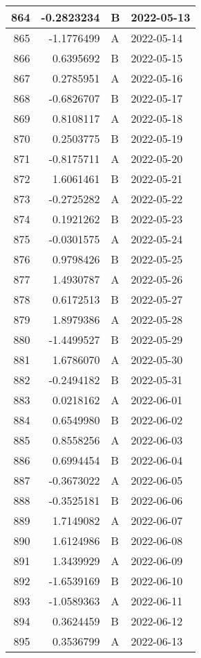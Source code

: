 \begin{tabular}{r|r|l|l}
\hline
864 & -0.2823234 & B & 2022-05-13\\
\hline
865 & -1.1776499 & A & 2022-05-14\\
\hline
866 & 0.6395692 & B & 2022-05-15\\
\hline
867 & 0.2785951 & A & 2022-05-16\\
\hline
868 & -0.6826707 & B & 2022-05-17\\
\hline
869 & 0.8108117 & A & 2022-05-18\\
\hline
870 & 0.2503775 & B & 2022-05-19\\
\hline
871 & -0.8175711 & A & 2022-05-20\\
\hline
872 & 1.6061461 & B & 2022-05-21\\
\hline
873 & -0.2725282 & A & 2022-05-22\\
\hline
874 & 0.1921262 & B & 2022-05-23\\
\hline
875 & -0.0301575 & A & 2022-05-24\\
\hline
876 & 0.9798426 & B & 2022-05-25\\
\hline
877 & 1.4930787 & A & 2022-05-26\\
\hline
878 & 0.6172513 & B & 2022-05-27\\
\hline
879 & 1.8979386 & A & 2022-05-28\\
\hline
880 & -1.4499527 & B & 2022-05-29\\
\hline
881 & 1.6786070 & A & 2022-05-30\\
\hline
882 & -0.2494182 & B & 2022-05-31\\
\hline
883 & 0.0218162 & A & 2022-06-01\\
\hline
884 & 0.6549980 & B & 2022-06-02\\
\hline
885 & 0.8558256 & A & 2022-06-03\\
\hline
886 & 0.6994454 & B & 2022-06-04\\
\hline
887 & -0.3673022 & A & 2022-06-05\\
\hline
888 & -0.3525181 & B & 2022-06-06\\
\hline
889 & 1.7149082 & A & 2022-06-07\\
\hline
890 & 1.6124986 & B & 2022-06-08\\
\hline
891 & 1.3439929 & A & 2022-06-09\\
\hline
892 & -1.6539169 & B & 2022-06-10\\
\hline
893 & -1.0589363 & A & 2022-06-11\\
\hline
894 & 0.3624459 & B & 2022-06-12\\
\hline
895 & 0.3536799 & A & 2022-06-13\\

\end{tabular}

